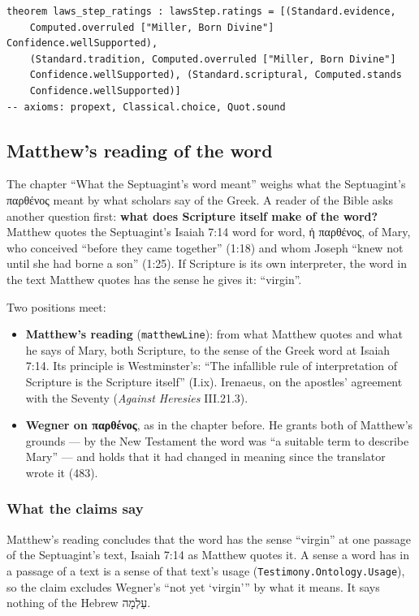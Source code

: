 \documentclass[11pt]{article}
\begin{document}
{\small\begin{verbatim}
theorem laws_step_ratings : lawsStep.ratings = [(Standard.evidence,
    Computed.overruled ["Miller, Born Divine"] Confidence.wellSupported),
    (Standard.tradition, Computed.overruled ["Miller, Born Divine"]
    Confidence.wellSupported), (Standard.scriptural, Computed.stands
    Confidence.wellSupported)]
-- axioms: propext, Classical.choice, Quot.sound
\end{verbatim}}
\subsection*{Matthew’s reading of the word}
The chapter “What the Septuagint’s word meant” weighs what the Septuagint’s παρθένος meant by what scholars say of the Greek. A reader of the Bible asks another question first: \textbf{what does Scripture itself make of the word?} Matthew quotes the Septuagint’s Isaiah 7:14 word for word, ἡ παρθένος, of Mary, who conceived “before they came together” (1:18) and whom Joseph “knew not until she had borne a son” (1:25). If Scripture is its own interpreter, the word in the text Matthew quotes has the sense he gives it: “virgin”.

Two positions meet:

\begin{itemize}
  \item \textbf{Matthew’s reading} (\texttt{matthew\allowbreak{}Line}): from what Matthew quotes and what he says of Mary, both Scripture, to the sense of the Greek word at Isaiah 7:14. Its principle is Westminster’s: “The infallible rule of interpretation of Scripture is the Scripture itself” (I.ix). Irenaeus, on the apostles’ agreement with the Seventy (\emph{Against Heresies} III.21.3).
  \item \textbf{Wegner on παρθένος}, as in the chapter before. He grants both of Matthew’s grounds — by the New Testament the word was “a suitable term to describe Mary” — and holds that it had changed in meaning since the translator wrote it (483).
\end{itemize}
\subsubsection*{What the claims say}
Matthew’s reading concludes that the word has the sense “virgin” at one passage of the Septuagint’s text, Isaiah 7:14 as Matthew quotes it. A sense a word has in a passage of a text is a sense of that text’s usage (\texttt{Testimony.Ontology.Usage}), so the claim excludes Wegner’s “not yet ‘virgin’” by what it means. It says nothing of the Hebrew עַלְמָה.
\end{document}
